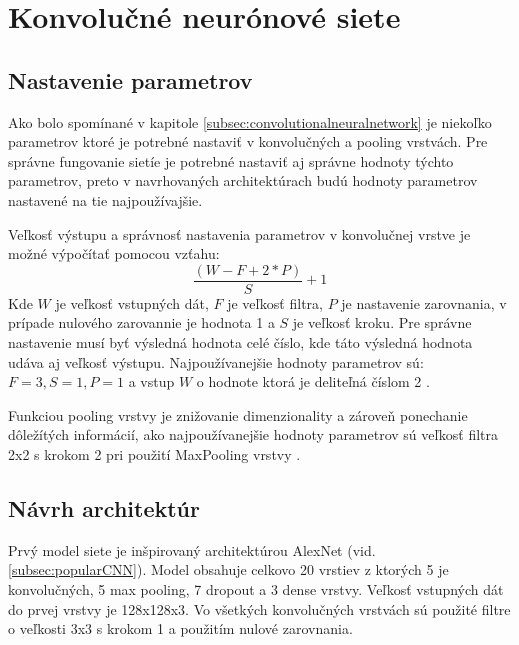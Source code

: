 
\section{Konvolučné neurónové siete}
\label{sec:architekuraCNN}

\subsection{Nastavenie parametrov}
\label{subsec:nastavenieparametrov}
Ako bolo spomínané v kapitole \ref{subsec:convolutionalneuralnetwork} je niekoľko parametrov ktoré je potrebné
    nastaviť v konvolučných a pooling vrstvách.
Pre správne fungovanie sietíe je potrebné nastaviť aj správne hodnoty týchto parametrov, preto v navrhovaných architektúrach budú
    hodnoty parametrov nastavené na tie najpoužívajšie.

Veľkosť výstupu a správnosť nastavenia parametrov v konvolučnej vrstve je možné výpočítať pomocou vzťahu:
\begin{equation}
    \frac{(W - F + 2*P)}{S} + 1
\end{equation}
Kde $W$ je veľkosť vstupných dát, $F$ je veľkosť filtra, $P$ je nastavenie zarovnania, v prípade nulového zarovannie je hodnota 1 a $S$ je veľkosť kroku.
Pre správne nastavenie musí byť výsledná hodnota celé číslo, kde táto výsledná hodnota udáva aj veľkosť výstupu.
Najpoužívanejšie hodnoty parametrov sú: $F = 3, S = 1, P = 1$ a vstup $W$ o hodnote ktorá je deliteľná číslom 2 \cite{odkaz:CNNArchitecture}.

Funkciou pooling vrstvy je znižovanie dimenzionality a zároveň ponechanie dôležítých informácií, ako najpoužívanejšie hodnoty parametrov sú
    veľkosť filtra 2x2 s krokom 2 pri použití MaxPooling vrstvy \cite{odkaz:CNNArchitecture}.


\subsection{Návrh architektúr}
\label{subsec:navrharchitektur}
Prvý model siete je inšpirovaný architektúrou AlexNet (vid. \ref{subsec:popularCNN}).
Model obsahuje celkovo 20 vrstiev z ktorých 5 je konvolučných, 5 max pooling, 7 dropout a 3 dense vrstvy.
Veľkosť vstupných dát do prvej vrstvy je 128x128x3.
Vo všetkých konvolučných vrstvách sú použité filtre o veľkosti 3x3 s krokom 1 a použitím nulové zarovnania.


